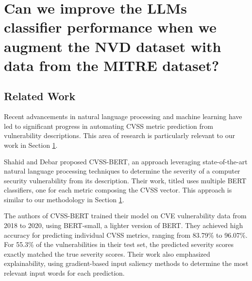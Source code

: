 \documentclass[12pt]{article}
\begin{document}


\section{Can we improve the LLMs classifier performance when we augment the NVD dataset with data
  from the MITRE dataset?}\label{cvss_prediction}

\subsection{Related Work}

Recent advancements in natural language processing and machine learning have led to significant
progress in automating CVSS metric prediction from vulnerability descriptions. This area of research
is particularly relevant to our work in Section \ref{cvss_prediction}.

Shahid and Debar \cite{cvss_bert} proposed CVSS-BERT, an approach leveraging state-of-the-art
natural language processing techniques to determine the severity of a computer security
vulnerability from its description. Their work, titled 
uses multiple BERT classifiers, one for each metric composing the CVSS vector. This approach is
similar to our methodology in Section \ref{cvss_prediction}.

The authors of CVSS-BERT trained their model on CVE vulnerability data from 2018 to 2020, using
BERT-small, a lighter version of BERT. They achieved high accuracy for predicting individual CVSS
metrics, ranging from 83.79\% to 96.07\%. For 55.3\% of the vulnerabilities in their test set, the
predicted severity scores exactly matched the true severity scores. Their work also emphasized
explainability, using gradient-based input saliency methods to determine the most relevant input
words for each prediction.
\end{document}
